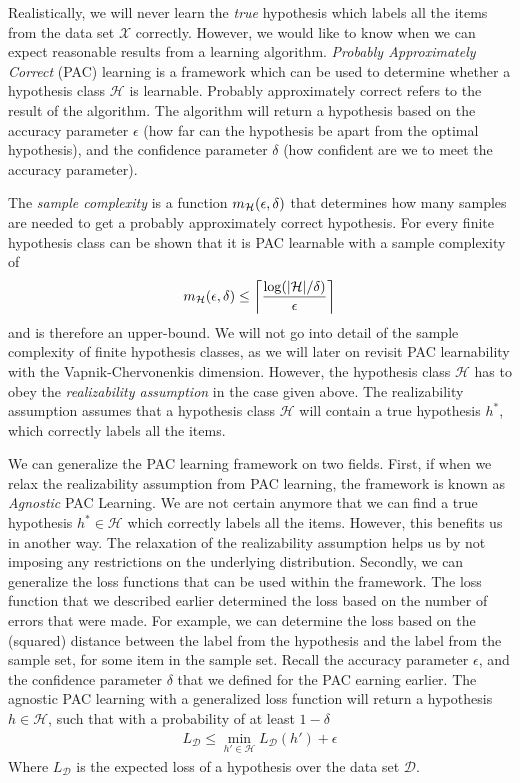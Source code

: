 \documentclass[../main.tex]{subfiles}
\begin{document}
Realistically, we will never learn the \emph{true} hypothesis which labels all the items from the data set $\mathcal{X}$ correctly.
However, we would like to know when we can expect reasonable results from a learning algorithm.
\emph{Probably Approximately Correct} (PAC) learning is a framework which can be used to determine whether a hypothesis class $\mathcal{H}$ is learnable.
Probably approximately correct refers to the result of the algorithm.
The algorithm will return a hypothesis based on the accuracy parameter $\epsilon$ (how far can the hypothesis be apart from the optimal hypothesis),
and the confidence parameter $\delta$ (how confident are we to meet the accuracy parameter).

The \emph{sample complexity} is a function $m_{\mathcal{H}}(\epsilon, \delta)$ that determines how many samples are needed to get a probably approximately correct hypothesis.
For every finite hypothesis class can be shown that it is PAC learnable with a sample complexity of
\begin{align}
    \label{eq:sample_complexity}
    m_{\mathcal{H}}(\epsilon, \delta) \leq \left\lceil\frac{\log(\lvert\mathcal{H}\rvert / \delta)}{\epsilon}\right\rceil
\end{align}
and is therefore an upper-bound.
We will not go into detail of the sample complexity of finite hypothesis classes, as we will later on revisit PAC learnability with the Vapnik-Chervonenkis dimension.
However, the hypothesis class $\mathcal{H}$ has to obey the \emph{realizability assumption} in the case given above.
The realizability assumption assumes that a hypothesis class $\mathcal{H}$ will contain a true hypothesis $h^*$, which correctly labels all the items.
\cite[Chapter~3]{Shalev2014understanding}

We can generalize the PAC learning framework on two fields.
First, if when we relax the realizability assumption from PAC learning, the framework is known as \emph{Agnostic} PAC Learning.
We are not certain anymore that we can find a true hypothesis $h^* \in \mathcal{H}$ which correctly labels all the items.
However, this benefits us in another way.
The relaxation of the realizability assumption helps us by not imposing any restrictions on the underlying distribution.
Secondly, we can generalize the loss functions that can be used within the framework.
The loss function that we described earlier determined the loss based on the number of errors that were made.
For example, we can determine the loss based on the (squared) distance between the label from the hypothesis and the label from the sample set, for some item in the sample set.
Recall the accuracy parameter $\epsilon$, and the confidence parameter $\delta$ that we defined for the PAC earning earlier.
The agnostic PAC learning with a generalized loss function will return a hypothesis $h \in \mathcal{H}$,
such that with a probability of at least $1 - \delta$
\begin{align}
    \label{eq:pac_loss}
    L_{\mathcal{D}} \le \min_{h' \in \mathcal{H}} L_{\mathcal{D}}(h') + \epsilon
\end{align}
Where $L_{\mathcal{D}}$ is the expected loss of a hypothesis over the data set $\mathcal{D}$.
\cite[Chapter~3]{Shalev2014understanding}
\end{document}
